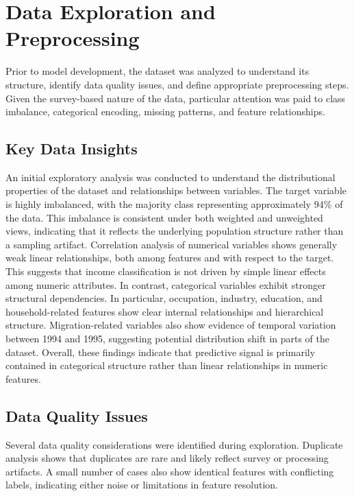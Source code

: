 
\section{Data Exploration and Preprocessing}

Prior to model development, the dataset was analyzed to understand its structure, identify data quality issues, and define appropriate preprocessing steps. Given the survey-based nature of the data, particular attention was paid to class imbalance, categorical encoding, missing patterns, and feature relationships.

\subsection{Key Data Insights}

An initial exploratory analysis was conducted to understand the distributional properties of the dataset and relationships between variables. The target variable is highly imbalanced, with the majority class representing approximately 94\% of the data. This imbalance is consistent under both weighted and unweighted views, indicating that it reflects the underlying population structure rather than a sampling artifact. Correlation analysis of numerical variables shows generally weak linear relationships, both among features and with respect to the target. This suggests that income classification is not driven by simple linear effects among numeric attributes. In contrast, categorical variables exhibit stronger structural dependencies. In particular, occupation, industry, education, and household-related features show clear internal relationships and hierarchical structure. Migration-related variables also show evidence of temporal variation between 1994 and 1995, suggesting potential distribution shift in parts of the dataset. Overall, these findings indicate that predictive signal is primarily contained in categorical structure rather than linear relationships in numeric features.

\subsection{Data Quality Issues}

Several data quality considerations were identified during exploration. Duplicate analysis shows that duplicates are rare and likely reflect survey or processing artifacts. A small number of cases also show identical features with conflicting labels, indicating either noise or limitations in feature resolution.


